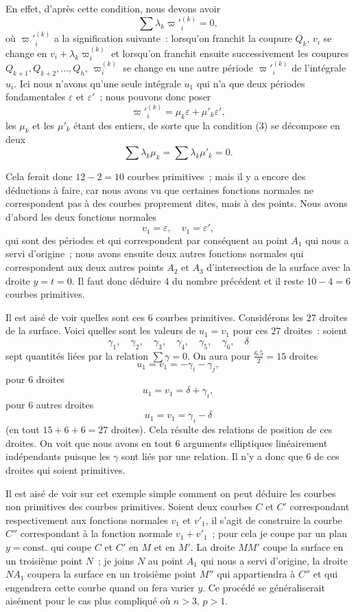 \documentclass{article}
\begin{document}
En effet, d'après cette condition, nous devons avoir
\[
\sum \lambda_{k} \varpi'^{(k)}_{i} = 0, \tag{3}
\]
où $\varpi'^{(k)}_{i}$ a la signification suivante~: lorsqu'on franchit la coupure $Q_{k}$, $v_{i}$ se change en $v_{i} + \lambda_{k} \varpi_{i}^{(k)}$ et lorsqu'on franchit ensuite successivement les coupures $Q_{k+1}, Q_{k+2}, \ldots, Q_{h}$, $\varpi_{i}^{(k)}$ se change en une autre période $\varpi'^{(k)}_{i}$ de l'intégrale $u_{i}$. Ici nous n'avons qu'une seule intégrale $u_{1}$ qui n'a que deux périodes fondamentales $\varepsilon$ et $\varepsilon'$~; nous pouvons donc poser
\[
\varpi'^{(k)}_{i} = \mu_{k} \varepsilon + \mu'_{k} \varepsilon',
\]
les $\mu_{k}$ et les $\mu'_{k}$ étant des entiers, de sorte que la condition (3) se décompose en deux
\[
\sum \lambda_{k} \mu_{k} = \sum \lambda_{k} \mu'_{k} = 0. \tag{4}
\]

Cela ferait donc $12 - 2 = 10$ courbes primitives~; mais il y a encore des déductions à faire, car nous avons vu que certaines fonctions normales ne correspondent pas à des courbes proprement dites, mais
à des points. Nous avons d'abord les deux fonctions normales
\[
v_{1} = \varepsilon, \quad v_{1} = \varepsilon',
\]
qui sont des périodes et qui correspondent par conséquent au point $A_{1}$ qui nous a servi d'origine~; nous avons ensuite deux autres fonctions normales qui correspondent aux deux autres points $A_{2}$ et $A_{3}$ d'intersection de la surface avec la droite $y = t = 0$. Il faut donc déduire $4$ du nombre précédent et il reste $10 - 4 = 6$ courbes primitives.

Il est aisé de voir quelles sont ces $6$ courbes primitives. Considérons les $27$ droites de la surface. Voici quelles sont les valeurs de $u_{1} = v_{1}$ pour ces $27$ droites~: soient
\[
\gamma_{1}, \quad \gamma_{2}, \quad \gamma_{3}, \quad \gamma_{4}, \quad \gamma_{5}, \quad \gamma_{6}, \quad \delta
\]
sept quantités liées par la relation $\displaystyle\sum \gamma = 0$. On aura pour $\frac{6.5}{2} = 15$ droites
\[
u_{1} = v_{1} = -\gamma_{i} - \gamma_{j},
\]
pour $6$ droites
\[
u_{1} = v_{1} = \delta + \gamma_{i},
\]
pour $6$ autres droites
\[
u_{1} = v_{1} = \gamma_{i} - \delta
\]
(en tout $15 + 6 + 6 = 27$ droites). Cela résulte des relations de position de ces droites. On voit que nous avons en tout $6$ arguments elliptiques linéairement indépendants puisque les $\gamma$ sont liés par une relation. Il n'y a donc que $6$ de ces droites qui soient primitives.

Il est aisé de voir sur cet exemple simple comment on peut déduire les courbes non primitives des courbes primitives. Soient deux courbes $C$ et $C'$ correspondant respectivement aux fonctions normales $v_{1}$ et $v'_{1}$, il s'agit de construire la courbe $C''$ correspondant à la fonction normale $v_{1} + v'_{1}$~; pour cela je coupe par un plan $y = \text{const.}$ qui coupe $C$ et $C'$ en $M$ et en $M'$. La droite $M M'$ coupe la surface en un troisième point $N$~; je joins $N$ au point $A_{1}$ qui nous a servi d'origine, la droite $N A_{1}$ coupera la surface en un troisième point $M''$ qui appartiendra à $C''$ et qui engendrera cette courbe quand on fera varier $y$. Ce procédé se généraliserait aisément pour le cas plus compliqué où $n > 3$, $p > 1$.
\end{document}

